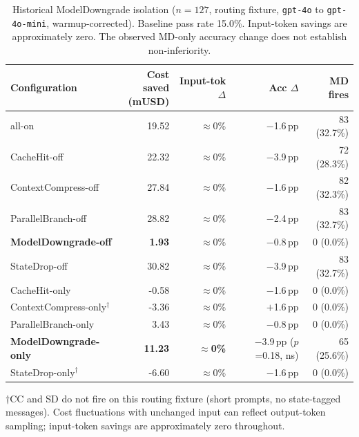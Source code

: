 \begin{table}[t]
\caption{Historical ModelDowngrade isolation ($n=127$, routing fixture, \texttt{gpt-4o} to \texttt{gpt-4o-mini}, warmup-corrected). Baseline pass rate 15.0\%. Input-token savings are approximately zero. The observed MD-only accuracy change does not establish non-inferiority.}
\label{tab:md-matrix}
\small
\begin{tabular}{lrrrr}
\toprule
Configuration & \makecell[r]{Cost saved\\(mUSD)} & Input-tok $\Delta$ & Acc $\Delta$ & MD fires \\
\midrule
all-on                          & 19.52 & $\approx$0\% & $-$1.6\,pp & 83 (32.7\%) \\
CacheHit-off                    & 22.32 & $\approx$0\% & $-$3.9\,pp & 72 (28.3\%) \\
ContextCompress-off             & 27.84 & $\approx$0\% & $-$1.6\,pp & 82 (32.3\%) \\
ParallelBranch-off              & 28.82 & $\approx$0\% & $-$2.4\,pp & 83 (32.7\%) \\
\textbf{ModelDowngrade-off}     & \textbf{1.93} & $\approx$0\% & $-$0.8\,pp & 0 (0.0\%) \\
StateDrop-off                   & 30.82 & $\approx$0\% & $-$3.9\,pp & 83 (32.7\%) \\
\midrule
CacheHit-only                   & -0.58 & $\approx$0\% & $-$1.6\,pp & 0 (0.0\%) \\
ContextCompress-only$^\dagger$  & -3.36 & $\approx$0\% & $+$1.6\,pp & 0 (0.0\%) \\
ParallelBranch-only             & 3.43 & $\approx$0\% & $-$0.8\,pp & 0 (0.0\%) \\
\textbf{ModelDowngrade-only}    & \textbf{11.23} & \textbf{$\approx$0\%} & $-$3.9\,pp ($p$=0.18, ns) & 65 (25.6\%) \\
StateDrop-only$^\dagger$        & -6.60 & $\approx$0\% & $-$1.6\,pp & 0 (0.0\%) \\
\bottomrule
\end{tabular}
\par\smallskip
\footnotesize{$\dagger$CC and SD do not fire on this routing fixture (short prompts,
no state-tagged messages). Cost fluctuations with unchanged input can reflect
output-token sampling; input-token savings are approximately zero throughout.}
\end{table}


